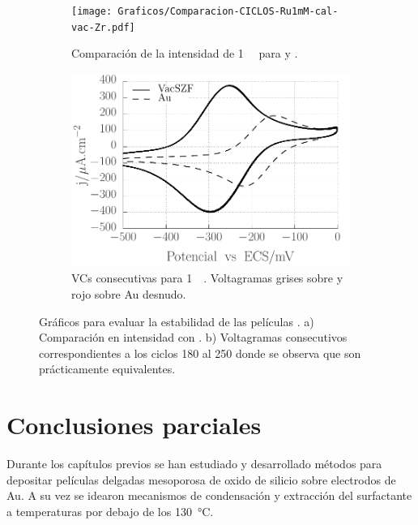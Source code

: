 		 			\begin{figure}[th]
			   	    \begin{subfigure}[t]{0.495\textwidth}
			        	\texttt{[image: Graficos/Comparacion-CICLOS-Ru1mM-cal-vac-Zr.pdf]}
			        	\vspace*{-0.40cm}\caption{Comparación de la intensidad de \ru\space \SI{1}{\milli\Molar} para \pdmF\space y \pdmZ.}
			        	\label{fig:zr-comp-a}
			         	\end{subfigure}
			     		\begin{subfigure}[t]{0.495\textwidth}
			        	\includegraphics[width=1\textwidth]{Graficos/Zr-Ru1mM-181-246Ciclos.pdf}
			        	\vspace*{-0.40cm}\caption{VCs consecutivas para  \ru\space \SI{1}{\milli\Molar}. Voltagramas grises sobre \pdmZ\space y rojo sobre Au desnudo.}
			        	\label{fig:zr-comp-b}
			         	\end{subfigure}
			         	\caption[Estabilidad de las \pdmZ]{Gráficos para evaluar la estabilidad de las películas \pdmZ\space. a) Comparación en intensidad con \pdmF. b) Voltagramas consecutivos correspondientes a los ciclos 180 al 250 donde se observa que son prácticamente equivalentes.}
			         	\label{fig:zr-comp}
			     	\end{figure}		

\section{Conclusiones parciales}
	
	Durante los capítulos previos se han estudiado y desarrollado métodos para depositar películas delgadas mesoporosa de oxido de silicio sobre electrodos de Au. A su vez se idearon mecanismos de condensación y extracción del surfactante a temperaturas por debajo de los \SI{130}{\celsius}. 

